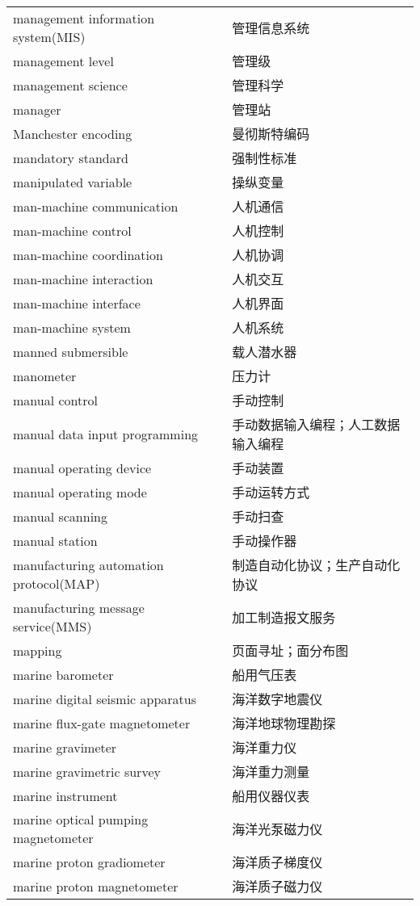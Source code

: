\documentclass[
]{article}
\begin{document}
\begin{longtable}[]{@{}ll@{}}
management information system(MIS) & 管理信息系统 \\
management level & 管理级 \\
management science & 管理科学 \\
manager & 管理站 \\
Manchester encoding & 曼彻斯特编码 \\
mandatory standard & 强制性标准 \\
manipulated variable & 操纵变量 \\
man-machine communication & 人机通信 \\
man-machine control & 人机控制 \\
man-machine coordination & 人机协调 \\
man-machine interaction & 人机交互 \\
man-machine interface & 人机界面 \\
man-machine system & 人机系统 \\
manned submersible & 载人潜水器 \\
manometer & 压力计 \\
manual control & 手动控制 \\
manual data input programming & 手动数据输入编程；人工数据输入编程 \\
manual operating device & 手动装置 \\
manual operating mode & 手动运转方式 \\
manual scanning & 手动扫查 \\
manual station & 手动操作器 \\
manufacturing automation protocol(MAP) &
制造自动化协议；生产自动化协议 \\
manufacturing message service(MMS) & 加工制造报文服务 \\
mapping & 页面寻址；面分布图 \\
marine barometer & 船用气压表 \\
marine digital seismic apparatus & 海洋数字地震仪 \\
marine flux-gate magnetometer & 海洋地球物理勘探 \\
marine gravimeter & 海洋重力仪 \\
marine gravimetric survey & 海洋重力测量 \\
marine instrument & 船用仪器仪表 \\
marine optical pumping magnetometer & 海洋光泵磁力仪 \\
marine proton gradiometer & 海洋质子梯度仪 \\
marine proton magnetometer & 海洋质子磁力仪 \\

\end{longtable}
\end{document}
